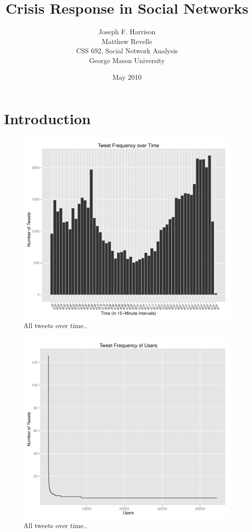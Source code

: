 \documentclass[a4paper, 11pt, titlepage]{article}
\begin{document}
\title{Crisis Response in Social Networks}
\author{Joseph F. Harrison \\
        Matthew Revelle \\
        CSS 692, Social Network Analysis \\
        George Mason University}
\date{May 2010}
\maketitle

\tableofcontents
\newpage

\section{Introduction}

\begin{figure}[h]
\centering
\label{fig:all_tweets_over_time}
\includegraphics[width=120mm]{../figures/all_tweets_over_time}
\caption{All tweets over time..}
\end{figure}

\begin{figure}[h]
\centering
\label{fig:all_tweets_by_users}
\includegraphics[width=120mm]{../figures/all_tweets_by_users}
\caption{All tweets over time..}
\end{figure}
\end{document}
